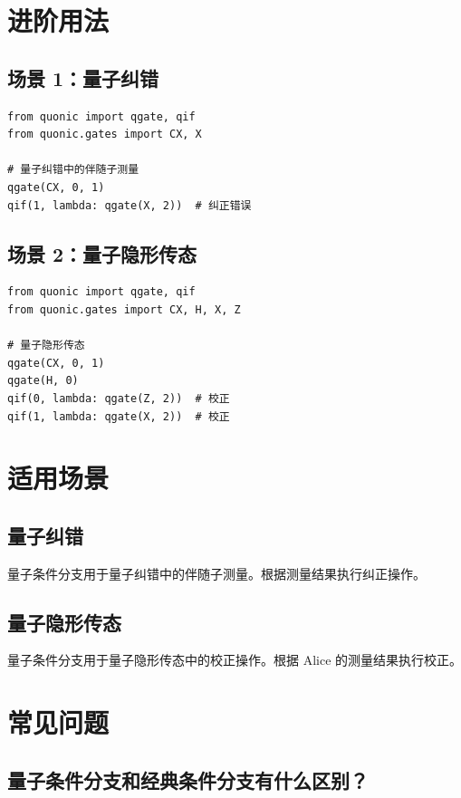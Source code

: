 \documentclass[12pt,a4paper]{article}
\begin{document}
\section{进阶用法}

\subsection{场景 1：量子纠错}

\begin{verbatim}
from quonic import qgate, qif
from quonic.gates import CX, X

# 量子纠错中的伴随子测量
qgate(CX, 0, 1)
qif(1, lambda: qgate(X, 2))  # 纠正错误
\end{verbatim}

\subsection{场景 2：量子隐形传态}

\begin{verbatim}
from quonic import qgate, qif
from quonic.gates import CX, H, X, Z

# 量子隐形传态
qgate(CX, 0, 1)
qgate(H, 0)
qif(0, lambda: qgate(Z, 2))  # 校正
qif(1, lambda: qgate(X, 2))  # 校正
\end{verbatim}

\section{适用场景}

\subsection{量子纠错}

量子条件分支用于量子纠错中的伴随子测量。根据测量结果执行纠正操作。

\subsection{量子隐形传态}

量子条件分支用于量子隐形传态中的校正操作。根据 Alice 的测量结果执行校正。

\section{常见问题}

\subsection{量子条件分支和经典条件分支有什么区别？}
\end{document}
